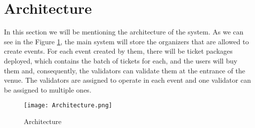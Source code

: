 \section{Architecture}
\label{sec:architecture}

In this section we will be mentioning the architecture of the system. As we can see in the Figure \ref{fig:architecture}, the main system will store the organizers that are allowed to create events. For each event created by them, there will be ticket packages deployed, which contains the batch of tickets for each, and the users will buy them and, consequently, the validators can validate them at the entrance of the venue. The validators are assigned to operate in each event and one validator can be assigned to multiple ones.

\begin{figure}[H]
    \texttt{[image: Architecture.png]}
    \centering
    \caption{Architecture}
    \label{fig:architecture}
\end{figure}
